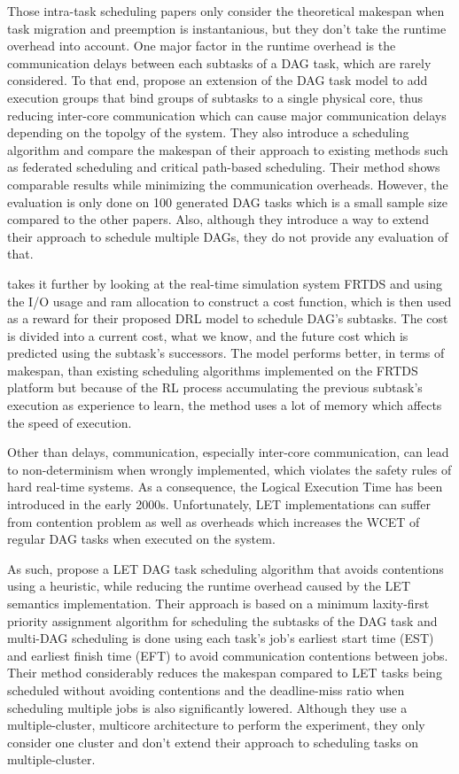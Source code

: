 Those intra-task scheduling papers only consider the theoretical
makespan when task migration and preemption 
is instantanious, but they don't take the runtime overhead into account.
One major factor in the runtime overhead is the communication 
delays between each subtasks of a DAG task, which are rarely considered.
To that end, \cite{Shi2024DagExecGroups}
propose an extension of the DAG task model to add 
execution groups that bind groups of subtasks
to a single physical core, thus reducing 
inter-core communication which can cause major
communication delays depending on the topolgy of the system.
They also introduce a scheduling algorithm 
and compare the makespan of their approach to existing methods
such as federated scheduling and critical path-based scheduling.
Their method shows comparable results while minimizing 
the communication overheads.
However, the evaluation is only done on 100 generated 
DAG tasks which is a small sample size compared to the other papers\cite{Zhao2022DAGsched}\cite{He2019DagIntra}.
Also, although they introduce a way to extend their approach to schedule
multiple DAGs, they do not provide any evaluation of that.

\cite{GuanFRTDS2020RL} takes it further by looking 
at the real-time simulation system FRTDS
and using the I/O usage and ram allocation to construct a cost 
function, which is then used as a reward for their proposed
DRL model to schedule DAG's subtasks.
The cost is divided into a current cost, what we know,
and the future cost which is predicted using the subtask's successors.
The model performs better, in terms of makespan, than 
existing scheduling algorithms implemented on the FRTDS platform 
but because of the RL process accumulating the previous subtask's
execution as experience to learn, the method uses a lot of memory
which affects the speed of execution.

Other than delays, communication, especially inter-core communication,
can lead to non-determinism when wrongly implemented,
which violates the safety rules of hard real-time systems.
As a consequence, the Logical Execution Time has been 
introduced in the early 2000s\cite{henzinger2003giotto}.
Unfortunately, LET implementations can suffer from contention problem
as well as overheads
which increases the WCET of regular DAG tasks when executed on the system.

As such, \cite{Igarashi2020HeuristicContentionFree}
propose a LET DAG task scheduling algorithm that
avoids contentions using a heuristic, while reducing the runtime
overhead caused by the LET semantics implementation.
Their approach is based on a minimum laxity-first priority
assignment algorithm for scheduling the subtasks of the DAG task
and multi-DAG scheduling is done using each task's job's earliest start time (EST)
and earliest finish time (EFT) to avoid communication contentions between jobs.
Their method considerably reduces the makespan 
compared to LET tasks being scheduled without 
avoiding contentions and the deadline-miss ratio when 
scheduling multiple jobs is also 
significantly lowered.
Although they use a multiple-cluster, multicore architecture to 
perform the experiment, they only consider one cluster
and don't extend their approach to scheduling tasks 
on multiple-cluster.

